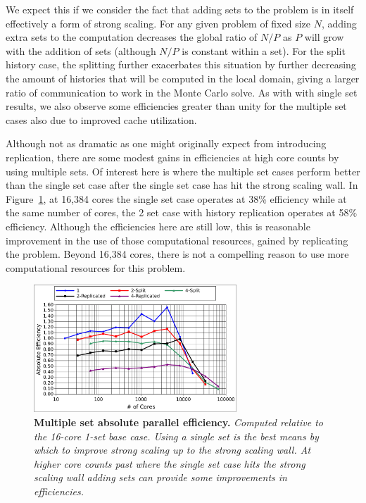 \documentclass{snamc2013}
\begin{document}
We expect this if we consider the fact that adding sets to the problem
is in itself effectively a form of strong scaling. For any given
problem of fixed size $N$, adding extra sets to the computation
decreases the global ratio of $N/P$ as $P$ will grow with the addition
of sets (although $N/P$ is constant within a set). For the split
history case, the splitting further exacerbates this situation by
further decreasing the amount of histories that will be computed in
the local domain, giving a larger ratio of communication to work in
the Monte Carlo solve. As with with single set results, we also
observe some efficiencies greater than unity for the multiple set
cases also due to improved cache utilization. 

Although not as dramatic as one might originally expect from
introducing replication, there are some modest gains in efficiencies
at high core counts by using multiple sets. Of interest here is where
the multiple set cases perform better than the single set case after
the single set case has hit the strong scaling wall. In
Figure~\ref{fig:titan_strong_ms_eff}, at 16,384 cores the single set
case operates at 38\% efficiency while at the same number of cores,
the 2 set case with history replication operates at 58\%
efficiency. Although the efficiencies here are still low, this is
reasonable improvement in the use of those computational resources,
gained by replicating the problem. Beyond 16,384 cores, there is not a
compelling reason to use more computational resources for this
problem.

\begin{figure}[h!]
  \begin{center}
    \includegraphics[width=3in]{titan_strong_ms_eff.pdf}
  \end{center}
  \caption{\textbf{Multiple set absolute parallel efficiency.}
    \textit{Computed relative to the 16-core 1-set base case. Using a
      single set is the best means by which to improve strong scaling
      up to the strong scaling wall. At higher core counts past where
      the single set case hits the strong scaling wall adding sets can
      provide some improvements in efficiencies.}}
  \label{fig:titan_strong_ms_eff}
\end{figure}
\end{document}
